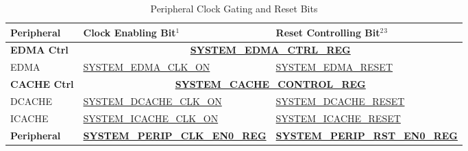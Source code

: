 \documentclass[main\_\_EN.tex]{subfiles}
\begin{document}
\begin{longtable}[c]{ |p{4cm}|p{6cm}|p{6cm}| }
\caption{Peripheral Clock Gating and Reset Bits}
\label{tab:sysreg-peripheral-controlling-bit}
\\\hline\rowcolor{lightgray}
Peripheral    & Clock Enabling Bit{\hyperref[other:sysreg-reset-notes]{$^1$}} & Reset Controlling Bit{\hyperref[other:sysreg-reset-notes]{$^2$}}{\hyperref[other:sysreg-reset-notes]{$^3$}}\\\hline

\textbf{EDMA Ctrl} & \multicolumn{2}{|c|}{\textbf{\hyperref[regdesc:SYSTEMEDMACTRLREG]{SYSTEM\_EDMA\_CTRL\_REG}}}\\\hline
EDMA & \hyperref[fielddesc:SYSTEMEDMACLKON]{SYSTEM\_EDMA\_CLK\_ON} & \hyperref[fielddesc:SYSTEMEDMARESET]{SYSTEM\_EDMA\_RESET}  \\\hline

\textbf{CACHE Ctrl} & \multicolumn{2}{|c|}{\textbf{\hyperref[regdesc:SYSTEMCACHECONTROLREG]{SYSTEM\_CACHE\_CONTROL\_REG}}}\\\hline
DCACHE & \hyperref[fielddesc:SYSTEMDCACHECLKON]{SYSTEM\_DCACHE\_CLK\_ON} & \hyperref[fielddesc:SYSTEMDCACHERESET]{SYSTEM\_DCACHE\_RESET} \\\hline
ICACHE & \hyperref[fielddesc:SYSTEMICACHECLKON]{SYSTEM\_ICACHE\_CLK\_ON} & \hyperref[fielddesc:SYSTEMICACHERESET]{SYSTEM\_ICACHE\_RESET} \\\hline

\textbf{Peripheral} & \textbf{\hyperref[regdesc:SYSTEMPERIPCLKEN0REG]{SYSTEM\_PERIP\_CLK\_EN0\_REG}} & \textbf{\hyperref[regdesc:SYSTEMPERIPRSTEN0REG]{SYSTEM\_PERIP\_RST\_EN0\_REG}} \\ \hline


\end{longtable}
\end{document}
